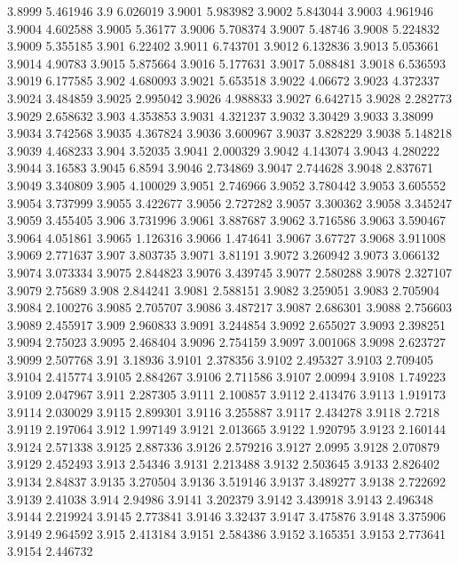 3.8999  5.461946
3.9  6.026019
3.9001  5.983982
3.9002  5.843044
3.9003  4.961946
3.9004  4.602588
3.9005  5.36177
3.9006  5.708374
3.9007  5.48746
3.9008  5.224832
3.9009  5.355185
3.901  6.22402
3.9011  6.743701
3.9012  6.132836
3.9013  5.053661
3.9014  4.90783
3.9015  5.875664
3.9016  5.177631
3.9017  5.088481
3.9018  6.536593
3.9019  6.177585
3.902  4.680093
3.9021  5.653518
3.9022  4.06672
3.9023  4.372337
3.9024  3.484859
3.9025  2.995042
3.9026  4.988833
3.9027  6.642715
3.9028  2.282773
3.9029  2.658632
3.903  4.353853
3.9031  4.321237
3.9032  3.30429
3.9033  3.38099
3.9034  3.742568
3.9035  4.367824
3.9036  3.600967
3.9037  3.828229
3.9038  5.148218
3.9039  4.468233
3.904  3.52035
3.9041  2.000329
3.9042  4.143074
3.9043  4.280222
3.9044  3.16583
3.9045  6.8594
3.9046  2.734869
3.9047  2.744628
3.9048  2.837671
3.9049  3.340809
3.905  4.100029
3.9051  2.746966
3.9052  3.780442
3.9053  3.605552
3.9054  3.737999
3.9055  3.422677
3.9056  2.727282
3.9057  3.300362
3.9058  3.345247
3.9059  3.455405
3.906  3.731996
3.9061  3.887687
3.9062  3.716586
3.9063  3.590467
3.9064  4.051861
3.9065  1.126316
3.9066  1.474641
3.9067  3.67727
3.9068  3.911008
3.9069  2.771637
3.907  3.803735
3.9071  3.81191
3.9072  3.260942
3.9073  3.066132
3.9074  3.073334
3.9075  2.844823
3.9076  3.439745
3.9077  2.580288
3.9078  2.327107
3.9079  2.75689
3.908  2.844241
3.9081  2.588151
3.9082  3.259051
3.9083  2.705904
3.9084  2.100276
3.9085  2.705707
3.9086  3.487217
3.9087  2.686301
3.9088  2.756603
3.9089  2.455917
3.909  2.960833
3.9091  3.244854
3.9092  2.655027
3.9093  2.398251
3.9094  2.75023
3.9095  2.468404
3.9096  2.754159
3.9097  3.001068
3.9098  2.623727
3.9099  2.507768
3.91  3.18936
3.9101  2.378356
3.9102  2.495327
3.9103  2.709405
3.9104  2.415774
3.9105  2.884267
3.9106  2.711586
3.9107  2.00994
3.9108  1.749223
3.9109  2.047967
3.911  2.287305
3.9111  2.100857
3.9112  2.413476
3.9113  1.919173
3.9114  2.030029
3.9115  2.899301
3.9116  3.255887
3.9117  2.434278
3.9118  2.7218
3.9119  2.197064
3.912  1.997149
3.9121  2.013665
3.9122  1.920795
3.9123  2.160144
3.9124  2.571338
3.9125  2.887336
3.9126  2.579216
3.9127  2.0995
3.9128  2.070879
3.9129  2.452493
3.913  2.54346
3.9131  2.213488
3.9132  2.503645
3.9133  2.826402
3.9134  2.84837
3.9135  3.270504
3.9136  3.519146
3.9137  3.489277
3.9138  2.722692
3.9139  2.41038
3.914  2.94986
3.9141  3.202379
3.9142  3.439918
3.9143  2.496348
3.9144  2.219924
3.9145  2.773841
3.9146  3.32437
3.9147  3.475876
3.9148  3.375906
3.9149  2.964592
3.915  2.413184
3.9151  2.584386
3.9152  3.165351
3.9153  2.773641
3.9154  2.446732
